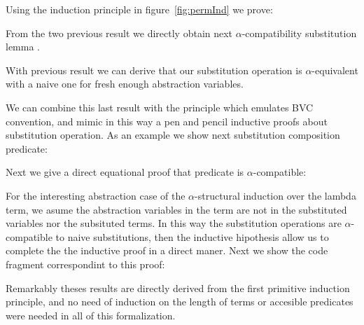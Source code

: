 \documentclass{article}
\newcommand{\alp}{\ensuremath{\alpha}}
\begin{document}
Using the induction principle in figure~\ref{fig:permInd} we prove:

 \hspace{5px}

From the two previous result we directly obtain next \alp-compatibility substitution lemma .

 \hspace{5px}

With previous result we can derive that our substitution operation is \alp-equivalent with a naive one for fresh enough abstraction variables.

 \hspace{5px}

We can combine this last result with the  principle which emulates BVC convention, and mimic in this way a pen and pencil inductive proofs about substitution operation. As an example we show next substitution composition predicate:

 \hspace{5px}

Next we give a direct equational proof that  predicate is \alp-compatible:

 \hspace{5px}

For the interesting abstraction case of the \alp-structural induction over the lambda term, we asume the abstraction variables in the term are not in the substituted variables nor the subsituted terms. In this way the substitution operations are \alp-compatible to naive substitutions, then the inductive hipothesis allow us to complete the the inductive proof in a direct maner. Next we show the code fragment correspondint to this proof:
 
 \hspace{5px}

Remarkably theses results are directly derived from the first primitive induction principle, and no need of induction on the length of terms or accesible predicates were needed in all of this formalization.

\appendix
\end{document}
